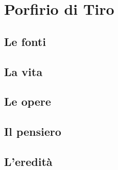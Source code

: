 \chapter{Porfirio di Tiro}

\section{Le fonti}

\section{La vita}

\section{Le opere}

\section{Il pensiero}

\section{L'eredità}
